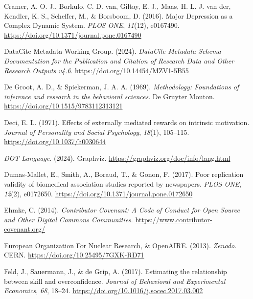 \documentclass[
  man, noextraspace,floatsintext]{apa7}
\newlength{\cslhangindent}
\newenvironment{CSLReferences}[2] %
 {\begin{list}{}{%
  \setlength{\itemindent}{0pt}
  \setlength{\leftmargin}{0pt}
  \setlength{\parsep}{0pt}
  \ifodd #1
   \setlength{\leftmargin}{\cslhangindent}
   \setlength{\itemindent}{-1\cslhangindent}
  \fi
  \setlength{\itemsep}{#2\baselineskip}}}
 {\end{list}}
\begin{document}
\begin{CSLReferences}{1}{0}
Cramer, A. O. J., Borkulo, C. D. van, Giltay, E. J., Maas, H. L. J. van der, Kendler, K. S., Scheffer, M., \& Borsboom, D. (2016). Major {Depression} as a {Complex Dynamic System}. \emph{PLOS ONE}, \emph{11}(12), e0167490. \url{https://doi.org/10.1371/journal.pone.0167490}

DataCite Metadata Working Group. (2024). \emph{{DataCite Metadata Schema Documentation} for the {Publication} and {Citation} of {Research Data} and {Other Research Outputs} v4.6}. \url{https://doi.org/10.14454/MZV1-5B55}

De Groot, A. D., \& Spiekerman, J. A. A. (1969). \emph{Methodology: {Foundations} of inference and research in the behavioral sciences}. De Gruyter Mouton. \url{https://doi.org/10.1515/9783112313121}

Deci, E. L. (1971). Effects of externally mediated rewards on intrinsic motivation. \emph{Journal of Personality and Social Psychology}, \emph{18}(1), 105--115. \url{https://doi.org/10.1037/h0030644}

\emph{{DOT Language}}. (2024). Graphviz. \url{https://graphviz.org/doc/info/lang.html}

Dumas-Mallet, E., Smith, A., Boraud, T., \& Gonon, F. (2017). Poor replication validity of biomedical association studies reported by newspapers. \emph{PLOS ONE}, \emph{12}(2), e0172650. \url{https://doi.org/10.1371/journal.pone.0172650}

Ehmke, C. (2014). \emph{Contributor {Covenant}: {A Code} of {Conduct} for {Open Source} and {Other Digital Commons Communities}}. \url{https://www.contributor-covenant.org/}

European Organization For Nuclear Research, \& OpenAIRE. (2013). \emph{Zenodo}. CERN. \url{https://doi.org/10.25495/7GXK-RD71}

Feld, J., Sauermann, J., \& de Grip, A. (2017). Estimating the relationship between skill and overconfidence. \emph{Journal of Behavioral and Experimental Economics}, \emph{68}, 18--24. \url{https://doi.org/10.1016/j.socec.2017.03.002}


\end{CSLReferences}
\end{document}

